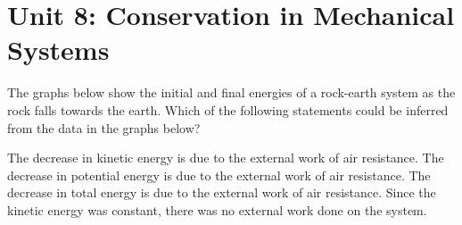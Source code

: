 \documentclass[dvipsnames]{exam}
\begin{document}
\section*{Unit 8: Conservation in Mechanical Systems}

\begin{questions}
\question
The graphs below show the initial and final energies of a rock-earth system as the rock falls towards the earth. Which of the following statements could be inferred from the data in the graphs below?

\begin{center}
    \hspace{1cm}
\end{center}

\begin{randomizechoices}[norandomize]
    \choice The decrease in kinetic energy is due to the external work of air resistance.
    \choice The decrease in potential energy is due to the external work of air resistance.
    \correctchoice The decrease in total energy is due to the external work of air resistance.
    \choice Since the kinetic energy was constant, there was no external work done on the system.
\end{randomizechoices}
\end{questions}
\end{document}
